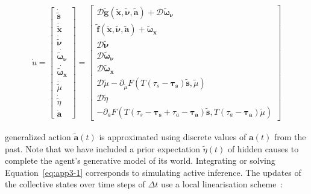 \documentclass[a4paper]{article} %
\begin{document}
\begin{align}
\dot{u}  = %
\left[\begin{array}{c} 
\dot{\tilde{\bm{s}}} \\ %
\dot{\tilde{\bm{x}}} \\ %
\dot{\tilde{\bm{\nu}}} \\  %
\dot{\bm{\tilde{\omega}_\nu}} \\  %
\dot{\bm{\tilde{\omega}_x}} \\  %
\dot{\tilde{\mu}} \\  %
\dot{\tilde{\eta}}\\  %
\dot{\bm{a}}  %
\end{array}\right] = %
%
\left[\begin{array}{c} 
\mathcal{D}\tilde{\bm{g}}(\tilde{\bm{x}}, \tilde{\bm{\nu}}, \tilde{\bm{a}}) + \mathcal{D}\bm{\tilde{\omega}_\nu} \\%
\tilde{\bm{f}}(\tilde{\bm{x}}, \tilde{\bm{\nu}}, \tilde{\bm{a}}) + \bm{\tilde{\omega}_x} \\%
\mathcal{D}\tilde{\bm{\nu}} \\%
\mathcal{D}\bm{\tilde{\omega}_\nu} \\%
\mathcal{D}\bm{\tilde{\omega}_x} \\%
\mathcal{D}\tilde{\mu} - \partial_{\tilde{\mu}} F( T(\tau_s -\bm{\tau_s}) \bm{\tilde{s}}, \tilde{\mu})\\  %
\mathcal{D}\tilde{\eta}\\  %
- \partial_{a} F( T(\tau_s -\bm{\tau_s} + \tau_a -\bm{\tau_a}) \bm{\tilde{s}}, T(\tau_a -\bm{\tau_a}) \tilde{\mu})  %
\end{array}\right]  \label{eq:app3-1} %
\end{align}%

generalized action $\bm{\tilde{a}}(t)$ is approximated using discrete values of $\bm{a}(t)$  from the past. Note that we have included a prior expectation $\tilde{\eta}(t)$ of hidden causes to complete the agent's generative model of its world. Integrating or solving Equation~\ref{eq:app3-1} corresponds to simulating active inference. The updates of the collective states over time steps of $\Delta t$ use a local linearisation scheme~\citep{Ozaki92}:
\end{document}
